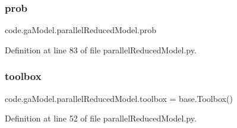\subsubsection{\texorpdfstring{prob}{prob}}
{\footnotesize\ttfamily code.\+ga\+Model.\+parallel\+Reduced\+Model.\+prob}



Definition at line 83 of file parallel\+Reduced\+Model.\+py.

\mbox{\label{namespacecode_1_1ga_model_1_1parallel_reduced_model_acb750d4b16db1f5e7cd91c159220be50}} 
\subsubsection{\texorpdfstring{toolbox}{toolbox}}
{\footnotesize\ttfamily code.\+ga\+Model.\+parallel\+Reduced\+Model.\+toolbox = base.\+Toolbox()}



Definition at line 52 of file parallel\+Reduced\+Model.\+py.

